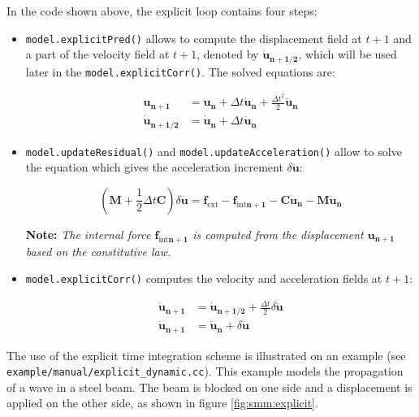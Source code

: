 \documentclass[a4paper,11pt]{book}
\newcommand{\code}[1]{\texttt{#1}}
\newcommand{\note}[1]{\textbf{Note: }\textit{#1}}
\renewcommand{\vec}[1]{\ensuremath{\boldsymbol{#1}}}
\newcommand{\mat}[1]{\ensuremath{\boldsymbol{#1}}}
\newcommand{\st}[1]{{\mathrm{#1}}}
\begin{document}
In the code shown above, the explicit loop contains four steps:
\begin{itemize}
\item \code{model.explicitPred()}  allows to  compute the displacement  field at
  $t+1$   and   a  part   of   the  velocity   field   at   $t+1$,  denoted   by
  $\vec{\dot{u}_{n+1/2}}$,    which    will     be    used    later    in    the
  \code{model.explicitCorr()}. The solved equations are:

  \begin{align}
    \vec{u_{n+1}}  &= \vec{u_{n}}  + \Delta  t \vec{\dot{u}_{n}}  + \frac{\Delta
      t^2}{2} \vec{\ddot{u}_{n}}\\
    \vec{\dot{u}_{n+1/2}}  &= \vec{\dot{u}_{n}} +  \Delta t  \vec{\ddot{u}_{n}}
    \label{eqn:smm:explicit:onehalfvelocity}
  \end{align}

\item \code{model.updateResidual()}  and \code{model.updateAcceleration()} allow
  to  solve  the  equation   which  gives  the  acceleration  increment  $\delta
  \vec{\ddot{u}}$:

  \begin{equation}
    \left(\mat{M}  +  \frac{1}{2}  \Delta  t \mat{C}\right)  \delta  \vec{\ddot{u}}  =
      \vec{f_{\st{ext}}} -  \vec{f_{\st{int}n+1}} - \mat{C}  \vec{\dot{u}_{n}} -
      \mat{M} \vec{\ddot{u}_{n}}
  \end{equation}

  \note{The  internal   force  $\vec{f_{\st{int}n+1}}$  is   computed  from  the
    displacement $\vec{u_{n+1}}$ based on the constitutive law.}

\item \code{model.explicitCorr()} computes  the velocity and acceleration fields
  at $t+1$:

  \begin{align}
    \vec{\dot{u}_{n+1}}  &= \vec{\dot{u}_{n+1/2}} + \frac{\Delta t}{2} \delta \vec{\ddot{u}} \\
    \vec{\ddot{u}_{n+1}}  &= \vec{\ddot{u}_{n}} +  \delta \vec{\ddot{u}}
  \end{align}
\end{itemize}

The use  of the explicit  time integration scheme  is illustrated on  an example
(see  \code{example/manual/explicit\_dynamic.cc}).    This  example  models  the
propagation of  a wave in a  steel beam. The beam  is blocked on one  side and a
displacement   is   applied   on   the   other  side,   as   shown   in   figure
\ref{fig:smm:explicit}.
\end{document}
